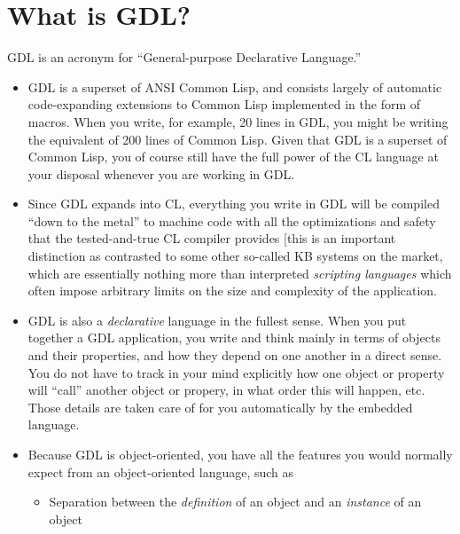 \documentclass [11pt]{book}
\begin{document}
\section{What is GDL?}

\label{sec:whatisgdl?}

GDL is an acronym for
``General-purpose Declarative Language.''

\begin{itemize}

\item GDL is a superset of ANSI Common Lisp, and consists largely of
automatic code-expanding extensions to Common Lisp implemented in the
form of macros. When you write, for example, 20 lines in GDL, you
might be writing the equivalent of 200 lines of Common Lisp. Given
that GDL is a superset of Common Lisp, you of course still have the
full power of the CL language at your disposal whenever you are
working in GDL.
\item Since GDL expands into CL, everything you write in GDL will be
compiled ``down to the metal'' to machine code with all the
optimizations and safety that the tested-and-true CL compiler provides
[this is an important distinction as contrasted to some other
so-called KB systems on the market, which are essentially nothing more
than interpreted \emph{scripting languages} which often impose arbitrary limits on
the size and complexity of the application.

\item GDL is also a \emph{declarative} language in the fullest sense. When you put together a
GDL application, you write and think mainly in terms of objects and
their properties, and how they depend on one another in a direct
sense. You do not have to track in your mind explicitly how one object
or property will ``call'' another object or propery, in what order
this will happen, etc. Those details are taken care of for you
automatically by the embedded language.

\item Because GDL is object-oriented, you have all the features you would normally expect
from an object-oriented language, such as 

\begin{itemize}

\item Separation between the \emph{definition} of an object and an \emph{instance} of an object


\end{itemize}
\end{itemize}
\end{document}
